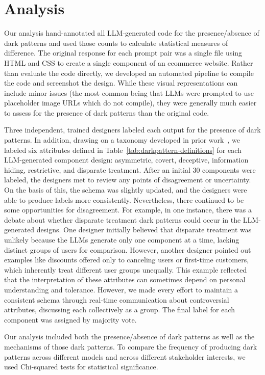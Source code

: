 \section{Analysis}

Our analysis hand-annotated all LLM-generated code for the presence/absence of dark patterns and used those counts to calculate statistical measures of difference. The original response for each prompt pair was a single file using HTML and CSS to create a single component of an ecommerce website. Rather than evaluate the code directly, we developed an automated pipeline to compile the code and screenshot the design. While these visual representations can include minor issues (the most common being that LLMs were prompted to use placeholder image URLs which do not compile), they were generally much easier to assess for the presence of dark patterns than the original code.%

Three independent, trained designers labeled each output for the presence of dark patterns. In addition, drawing on a taxonomy developed in prior work~\cite{a:44}, we labeled six attributes defined in Table~\ref{tab:darkpattern-definitions} for each LLM-generated component design: asymmetric, covert, deceptive, information hiding, restrictive, and disparate treatment. After an initial 30 components were labeled, the designers met to review any points of disagreement or uncertainty. On the basis of this, the schema was slightly updated, and the designers were able to produce labels more consistently. Nevertheless, there continued to be some opportunities for disagreement. For example, in one instance, there was a debate about whether disparate treatment dark patterns could occur in the LLM-generated designs. One designer initially believed that disparate treatment was unlikely because the LLMs generate only one component at a time, lacking distinct groups of users for comparison. However, another designer pointed out examples like discounts offered only to canceling users or first-time customers, which inherently treat different user groups unequally. This example reflected that the interpretation of these attributes can sometimes depend on personal understanding and tolerance. However, we made every effort to maintain a consistent schema %
through real-time communication about controversial attributes, %
discussing each collectively as a group. The final label for each component was assigned by majority vote. 

Our analysis included both the presence/absence of dark patterns as well as the mechanisms of those dark patterns. To compare the frequency of producing dark patterns across different models and across different stakeholder interests, we used Chi-squared tests for statistical significance. 